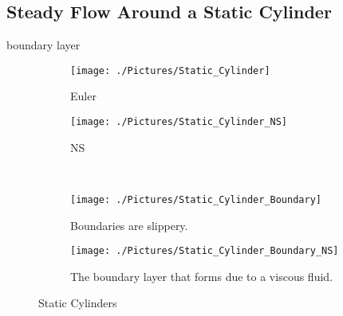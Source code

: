 \documentclass[10pt, titlepage]{article}
\begin{document}
\subsection{Steady Flow Around a Static Cylinder}

boundary layer \\
\lipsum[1]

\begin{figure}[htbp]
\centering
\begin{subfigure}[t]{0.5\linewidth}
  \centering
  \texttt{[image: ./Pictures/Static\_Cylinder]}
  \caption{Euler}
  \label{fig:staticeuler}
\end{subfigure}%
\begin{subfigure}[t]{0.5\linewidth}
  \centering
  \texttt{[image: ./Pictures/Static\_Cylinder\_NS]}
  \caption{NS}
  \label{fig:staticNS}
\end{subfigure} \\
\begin{subfigure}[t]{0.5\linewidth}
 \centering
 \texttt{[image: ./Pictures/Static\_Cylinder\_Boundary]}
 \caption{Boundaries are slippery.}
 \label{fig:eulerboundary}
\end{subfigure}%
\begin{subfigure}[t]{0.5\linewidth}
 \centering
 \texttt{[image: ./Pictures/Static\_Cylinder\_Boundary\_NS]}
 \caption{The boundary layer that forms due to a viscous fluid.}
 \label{fig:nsboundary}
\end{subfigure}
\caption[Static Cylinder]{Static Cylinders}
\label{fig:static}
\end{figure}
\end{document}
